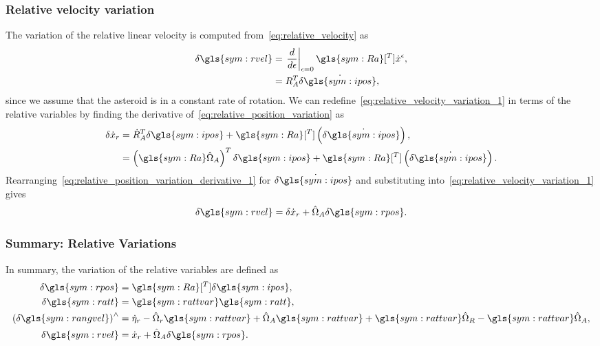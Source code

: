 \subsubsection{Relative velocity variation}
The variation of the relative linear velocity is computed from~\cref{eq:relative_velocity} as
\begin{align}\label{eq:relative_velocity_variation_1}
    \delta \gls{sym:rvel} &= \left. \diff{}{\epsilon} \right|_{\epsilon=0} \gls{sym:Ra}[^T] \dot{x}^\epsilon , \nonumber \\
                          &= R_A^T \delta \dot{\gls{sym:ipos}},
\end{align}
since we assume that the asteroid is in a constant rate of rotation.
We can redefine~\cref{eq:relative_velocity_variation_1} in terms of the relative variables by finding the derivative of~\cref{eq:relative_position_variation} as
\begin{align}\label{eq:relative_position_variation_derivative_1}
    \delta \dot{x}_r &= \dot{R}_A^T \delta \gls{sym:ipos} + \gls{sym:Ra}[^T] \parenth{\delta \dot{\gls{sym:ipos}}}, \nonumber \\
                     &= \parenth{\gls{sym:Ra} \hat{\Omega}_A}^T \delta\gls{sym:ipos} + \gls{sym:Ra}[^T] \parenth{\delta \dot{\gls{sym:ipos}}}.
\end{align}
Rearranging~\cref{eq:relative_position_variation_derivative_1} for \(\delta \dot{\gls{sym:ipos}} \) and substituting into~\cref{eq:relative_velocity_variation_1} gives
\begin{align}\label{eq:relative_velocity_variation}
    \delta \gls{sym:rvel} = \delta \dot{x}_r + \hat{\Omega}_A \delta \gls{sym:rpos}.
\end{align}

\subsubsection{Summary: Relative Variations}
In summary, the variation of the relative variables are defined as
\begin{align}
    \delta \gls{sym:rpos} &= \gls{sym:Ra}[^T] \delta \gls{sym:ipos}, \\
    \delta \gls{sym:ratt} &= \gls{sym:rattvar} \gls{sym:ratt} ,\\
    \parenth{\delta \gls{sym:rangvel}}^\wedge&= \dot{\eta}_r - \hat{\Omega}_r \gls{sym:rattvar} + \hat{\Omega}_A \gls{sym:rattvar} + \gls{sym:rattvar} \hat{\Omega}_R - \gls{sym:rattvar} \hat{\Omega}_A, \\
    \delta \gls{sym:rvel} &= \dot{x}_r + \hat{\Omega}_A \delta \gls{sym:rpos} .
\end{align}
